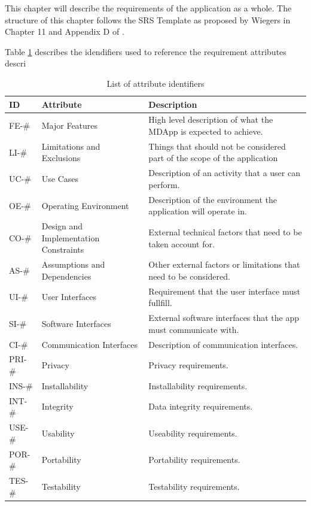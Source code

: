 This chapter will describe the requirements of the application as a whole. The structure of this chapter follows the SRS Template as proposed by Wiegers in Chapter 11 and Appendix D of \cite{wiegers2013software}.

Table \ref{tab:ids} describes the idendifiers used to reference the requirement attributes descri

\begin{table}[H]
    \small
    \begin{tabular}[t]{ | l | p{3.5cm} | p{6.5cm} |} \hline

        \textbf{ID} & \textbf{Attribute} & \textbf{Description} \\ \hline
        FE-\# & Major Features & High level description of what the MDApp is expected to achieve. \\ \hline
        LI-\# & Limitations and Exclusions & Things that should not be considered part of the scope of the application \\ \hline
        UC-\# & Use Cases & Description of an activity that a user can perform. \\ \hline
        OE-\# & Operating Environment & Description of the environment the application will operate in. \\ \hline
        CO-\# & Design and Implementation Constraints & External technical factors that need to be taken account for. \\ \hline
        AS-\# & Assumptions and Dependencies & Other external factors or limitations that need to be considered. \\ \hline
        UI-\# & User Interfaces & Requirement that the user interface must fullfill. \\ \hline
        SI-\# & Software Interfaces & External software interfaces that the app must communicate with. \\ \hline
        CI-\# & Communication Interfaces & Description of communication interfaces. \\ \hline
        PRI-\# & Privacy & Privacy requirements. \\ \hline
        INS-\# & Installability & Installability requirements. \\ \hline
        INT-\# & Integrity & Data integrity requirements. \\ \hline
        USE-\# & Usability & Useability requirements. \\ \hline
        POR-\# & Portability & Portability requirements. \\ \hline
        TES-\# & Testability & Testability requirements. \\ \hline

    \end{tabular}
    \caption{List of attribute identifiers}
    \label{tab:ids}
\end{table}

